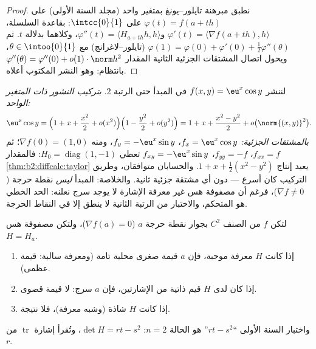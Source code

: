 \begin{proof}
نطبق مبرهنة تايلور--يونغ بمتغير واحد (مجلد السنة الأولى) على
$\varphi(t) = f(a + th)$ على $\intcc{0}{1}$: بقاعدة السلسلة،
$\varphi'(t) = \langle \nabla f(a + th), h\rangle$ و$\varphi''(t)
= \langle H_{a+th}h, h\rangle$، وكلاهما  بدلالة $t$. ثم
$\varphi(1) = \varphi(0) + \varphi'(0) + \frac12\varphi''(\theta)$
(تايلور--لاغرانج) مع $\theta \in \intoo{0}{1}$، ويحول اتصال المشتقات الجزئية الثانية
المقدار $\varphi''(\theta) =
\varphi''(0) + o(1)\cdot\norm h^2$ بانتظام: وهو النشر المكتوب أعلاه.
\end{proof}

\begin{example}\label{ex:b2:diffcalc:taylortwoways}
لننشر $f(x, y) = \eu^x\cos y$ في المبدأ حتى الرتبة $2$.
\emph{بتركيب النشور ذات المتغير الواحد:}
\[
\eu^x\cos y = \Bigl(1 + x + \frac{x^2}{2} +
o(x^2)\Bigr)\Bigl(1 - \frac{y^2}{2} + o(y^2)\Bigr)
= 1 + x + \frac{x^2 - y^2}{2} + o\bigl(\norm{(x,y)}^2\bigr) .
\]
\emph{بالمشتقات الجزئية:} $f_x = \eu^x\cos y$، $f_y =
-\eu^x\sin y$، ومنه $\nabla f(0) = (1, 0)$؛ ثم $f_{xx} = f$،
$f_{yy} = -f$، $f_{xy} = -\eu^x\sin y$ تعطي $H_0 =
\operatorname{diag}(1, -1)$: فالمقدار \cref{thm:b2:diffcalc:taylor}
يعيد إنتاج $1 + x + \frac12(x^2 - y^2)$. والحسابان متوافقان، وطريق التركيب كان أسرع ---
دون أي مشتقة جزئية ثانية. والخلاصة: المبدأ \emph{ليس} نقطة حرجة
($\nabla f \neq 0$)، فرغم أن مصفوفة هس غير معرفة الإشارة لا يوجد سرج نعلنه:
الحد الخطي هو المتحكم، والاختبار من الرتبة الثانية لا ينطق إلا في
النقاط الحرجة.
\end{example}

\begin{theorem}\label{thm:b2:diffcalc:extrema}
لتكن $f$ من الصنف $C^2$ بجوار نقطة حرجة $a$ ($\nabla f(a) = 0$)،
ولتكن مصفوفة هس $H = H_a$.
\begin{enumerate}
  \item إذا كانت $H$ معرفة موجبة، فإن $a$ قيمة صغرى محلية تامة
        (ومعرفة سالبة: قيمة عظمى).
  \item إذا كان لدى $H$ قيم ذاتية من الإشارتين، فإن $a$ سرج: لا
        قيمة قصوى.
  \item إذا كانت $H$ شاذة (وشبه معرفة)، فلا نتيجة.
\end{enumerate}
واختبار السنة الأولى ``$rt - s^2$'' هو الحالة $n = 2$: $\det H = rt -
s^2$، وتُقرأ إشارة
$\operatorname{tr}$ من $r$.
\end{theorem}

